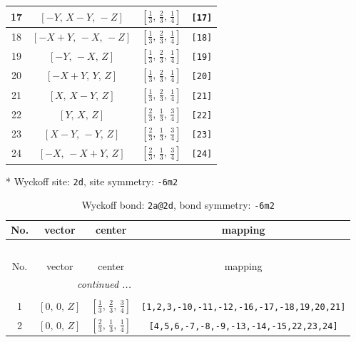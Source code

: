 \documentclass[fleqn,8pt]{jsarticle}
\begin{document}
\begin{longtable}{cccc}
17 & $\left[ - Y,\, X - Y,\, - Z \right]$ & $\left[ \frac{1}{3},\, \frac{2}{3},\, \frac{1}{4} \right]$ & {\tt [17]} \\ \hline
18 & $\left[ - X + Y,\, - X,\, - Z \right]$ & $\left[ \frac{1}{3},\, \frac{2}{3},\, \frac{1}{4} \right]$ & {\tt [18]} \\ \hline
19 & $\left[ - Y,\, - X,\, Z \right]$ & $\left[ \frac{1}{3},\, \frac{2}{3},\, \frac{1}{4} \right]$ & {\tt [19]} \\ \hline
20 & $\left[ - X + Y,\, Y,\, Z \right]$ & $\left[ \frac{1}{3},\, \frac{2}{3},\, \frac{1}{4} \right]$ & {\tt [20]} \\ \hline
21 & $\left[ X,\, X - Y,\, Z \right]$ & $\left[ \frac{1}{3},\, \frac{2}{3},\, \frac{1}{4} \right]$ & {\tt [21]} \\ \hline
22 & $\left[ Y,\, X,\, Z \right]$ & $\left[ \frac{2}{3},\, \frac{1}{3},\, \frac{3}{4} \right]$ & {\tt [22]} \\ \hline
23 & $\left[ X - Y,\, - Y,\, Z \right]$ & $\left[ \frac{2}{3},\, \frac{1}{3},\, \frac{3}{4} \right]$ & {\tt [23]} \\ \hline
24 & $\left[ - X,\, - X + Y,\, Z \right]$ & $\left[ \frac{2}{3},\, \frac{1}{3},\, \frac{3}{4} \right]$ & {\tt [24]} \\
\end{longtable}
* Wyckoff site: {\tt 2d}, site symmetry: {\tt -6m2}
\renewcommand{\arraystretch}{1.2}
\begin{longtable}{cccc}
\caption{Wyckoff bond: {\tt 2a@2d}, bond symmetry: {\tt -6m2}}
 \\
 \hline \hline
No. & vector & center & mapping \\ \hline \endfirsthead

\multicolumn{3}{l}{\tablename\ \thetable{}} \\
 \hline \hline
No. & vector & center & mapping \\ \hline \endhead

 \hline \hline
\multicolumn{3}{r}{\footnotesize\it continued ...} \\ \endfoot

 \hline \hline
\multicolumn{3}{r}{} \\ \endlastfoot

1 & $\left[ 0,\, 0,\, Z \right]$ & $\left[ \frac{1}{3},\, \frac{2}{3},\, \frac{3}{4} \right]$ & {\tt [1,2,3,-10,-11,-12,-16,-17,-18,19,20,21]} \\ \hline
2 & $\left[ 0,\, 0,\, Z \right]$ & $\left[ \frac{2}{3},\, \frac{1}{3},\, \frac{1}{4} \right]$ & {\tt [4,5,6,-7,-8,-9,-13,-14,-15,22,23,24]} \\
\end{longtable}
\end{document}
